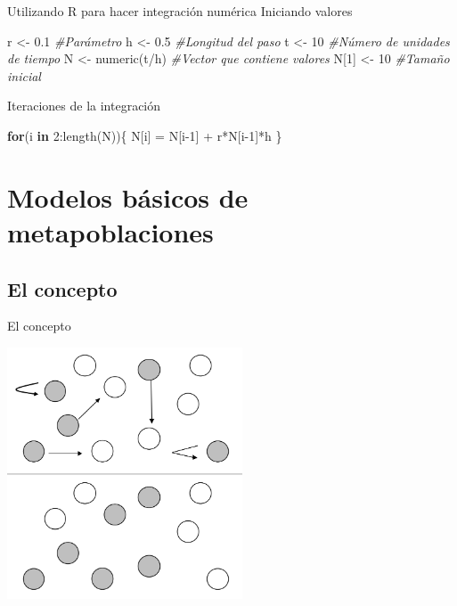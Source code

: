 \documentclass[
  11pt,
  ignorenonframetext,
]{beamer}
\newenvironment{Shaded}{}{}
\newcommand{\CommentTok}[1]{\textcolor[rgb]{0.38,0.63,0.69}{\textit{#1}}}
\newcommand{\ControlFlowTok}[1]{\textcolor[rgb]{0.00,0.44,0.13}{\textbf{#1}}}
\newcommand{\DecValTok}[1]{\textcolor[rgb]{0.25,0.63,0.44}{#1}}
\newcommand{\FloatTok}[1]{\textcolor[rgb]{0.25,0.63,0.44}{#1}}
\newcommand{\FunctionTok}[1]{\textcolor[rgb]{0.02,0.16,0.49}{#1}}
\newcommand{\NormalTok}[1]{#1}
\newcommand{\OtherTok}[1]{\textcolor[rgb]{0.00,0.44,0.13}{#1}}
\newcommand{\SpecialCharTok}[1]{\textcolor[rgb]{0.25,0.44,0.63}{#1}}
\begin{document}
\begin{frame}[fragile]{Utilizando R para hacer integración numérica}
Iniciando valores

\begin{Shaded}
\begin{Highlighting}[]
\NormalTok{r }\OtherTok{\textless{}{-}} \FloatTok{0.1} \CommentTok{\#Parámetro}
\NormalTok{h }\OtherTok{\textless{}{-}} \FloatTok{0.5} \CommentTok{\#Longitud del paso}
\NormalTok{t }\OtherTok{\textless{}{-}} \DecValTok{10} \CommentTok{\#Número de unidades de tiempo}
\NormalTok{N }\OtherTok{\textless{}{-}} \FunctionTok{numeric}\NormalTok{(t}\SpecialCharTok{/}\NormalTok{h) }\CommentTok{\#Vector que contiene valores}
\NormalTok{N[}\DecValTok{1}\NormalTok{] }\OtherTok{\textless{}{-}} \DecValTok{10} \CommentTok{\#Tamaño inicial}
\end{Highlighting}
\end{Shaded}

Iteraciones de la integración

\begin{Shaded}
\begin{Highlighting}[]
\ControlFlowTok{for}\NormalTok{(i }\ControlFlowTok{in} \DecValTok{2}\SpecialCharTok{:}\FunctionTok{length}\NormalTok{(N))\{}
\NormalTok{      N[i] }\OtherTok{=}\NormalTok{ N[i}\DecValTok{{-}1}\NormalTok{] }\SpecialCharTok{+}\NormalTok{ r}\SpecialCharTok{*}\NormalTok{N[i}\DecValTok{{-}1}\NormalTok{]}\SpecialCharTok{*}\NormalTok{h}
\NormalTok{  \}}
\end{Highlighting}
\end{Shaded}
\end{frame}

\hypertarget{modelos-buxe1sicos-de-metapoblaciones}{%
\section{Modelos básicos de
metapoblaciones}\label{modelos-buxe1sicos-de-metapoblaciones}}

\hypertarget{el-concepto}{%
\subsection{El concepto}\label{el-concepto}}

\begin{frame}{El concepto}
\begin{center}\includegraphics[width=2.75in]{Metapoblaciones/MEtap-May} \end{center}
\end{frame}
\end{document}
